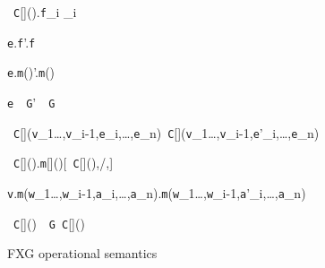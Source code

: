 \begin{figure*}
\vspace{-\bigskipamount}
\begin{minipage}{.35\textwidth}
\quad{}
	{\new~{\tt C}[]().{\tt f}_i _i}

	{{\tt e}.{\tt f}'.{\tt f}}

	{{\tt e}.{\tt m}()'.{\tt m}()}

	{{\tt e}~\as~{\tt G}'~\as~{\tt G}}
\end{minipage}%
\begin{minipage}{.65\textwidth}
\quad{}
	{\new~{\tt C}[]({\tt v}_1\ldots,{\tt v}_{i-1},{\tt e}_i,\ldots,{\tt e}_n)\derives\new~{\tt C}[]({\tt v}_1\ldots,{\tt v}_{i-1},{\tt e}'_i,\ldots,{\tt e}_n)}

	{\new~{\tt C}[]().{\tt m}[]()[\new~{\tt C}[](),/\this,]}

	{{\tt v}.{\tt m}({\tt w}_1\ldots,{\tt w}_{i-1},{\tt a}_i,\ldots,{\tt a}_n).{\tt m}({\tt w}_1\ldots,{\tt w}_{i-1},{\tt a}'_i,\ldots,{\tt a}_n)}

	{\new~{\tt C}[]()~\as~{\tt G}\derives\new~{\tt C}[]()}
\end{minipage}
\caption{{\sf FXG} operational semantics}
\label{fig:sos}
\end{figure*}


